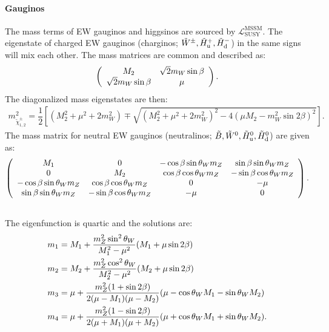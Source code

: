\paragraph{Gauginos}
The mass terms of EW gauginos and higgsinos are sourced by $\mathcal{L}^{\mathrm{MSSM}}_{\mathrm{SUSY}}$. The eigenstate of charged EW gauginos (charginos; $\tilde{W}^\pm, \tilde{H}^+_{\mathrm{u}}, \tilde{H}^-_{\mathrm{d}}$) in the same signs will mix each other.
The mass matrices are common and described as:
\begin{align}
\left(  
  \begin{array}{cc}
    M_2                    &  \sqrt{2} m_W \sin{\beta} \\
    \sqrt{2} m_W \sin{\beta} &  \mu                    \\
  \end{array}
\right). \nonumber
\end{align}
%
\noindent The diagonalized mass eigenstates are then:
\begin{align}
m_{\tilde{\chi}_{1,2}^{\pm}}^2 = \dfrac{1}{2} \left[ (M_2^2+\mu^2+2m_W^2) \mp \sqrt{(M_2^2+\mu^2+2m_W^2)^2 - 4(\mu M_2-m_W^2\sin2\beta)^2} \right].
\end{align}
%
\noindent The mass matrix for neutral EW gauginos (neutralinos; $\tilde{B}, \tilde{W}^0, \tilde{H}^0_{\mathrm{u}}, \tilde{H}^0_{\mathrm{d}}$) are given as:
\begin{align}
\left(  
  \begin{array}{cccc}
    M_1                       &  0                         & -\cos\beta\sin\theta_W m_Z &  \sin\beta\sin\theta_W m_Z   \\
    0                         &  M_2                       &  \cos\beta\cos\theta_W m_Z & -\sin\beta\cos\theta_W m_Z   \\
   -\cos\beta\sin\theta_W m_Z &  \cos\beta\cos\theta_W m_Z &  0                         & -\mu                         \\
    \sin\beta\sin\theta_W m_Z & -\sin\beta\cos\theta_W m_Z & -\mu                       &  0                           \\
  \end{array}
\right). \nonumber \\ \nonumber
\end{align}
The eigenfunction is quartic and the solutions are:
\begin{align}
m_1 & = M_1 + \frac{m_Z^2\sin^2{\theta_W}}{M_1^2-\mu^2} (M_1 + \mu\sin2\beta)   \nonumber \\
m_2 & = M_2 + \frac{m_Z^2\cos^2{\theta_W}}{M_2^2-\mu^2} (M_2 + \mu\sin2\beta)   \nonumber \\
m_3 & = \mu + \frac{m_Z^2(1+\sin{2\beta})}{2(\mu-M_1)(\mu-M_2)} (\mu-\cos{\theta_W}M_1-\sin{\theta_W}M_2)  \nonumber \\
m_4 & = \mu + \frac{m_Z^2(1-\sin{2\beta})}{2(\mu+M_1)(\mu+M_2)} (\mu+\cos{\theta_W}M_1+\sin{\theta_W}M_2).
\end{align}
